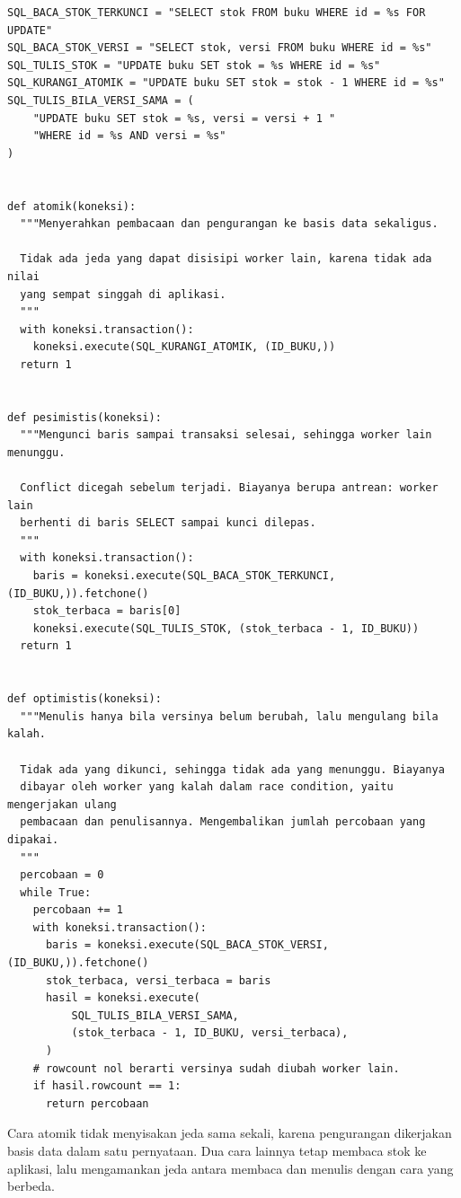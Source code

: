 \begin{lstlisting}[style=PythonStyle, caption={Tiga cara mencegah lost update, tersedia di \berkas{sources/chapter03/transaksi-konkuren.py}}, label={lst:konkuren}]
SQL_BACA_STOK_TERKUNCI = "SELECT stok FROM buku WHERE id = %s FOR UPDATE"
SQL_BACA_STOK_VERSI = "SELECT stok, versi FROM buku WHERE id = %s"
SQL_TULIS_STOK = "UPDATE buku SET stok = %s WHERE id = %s"
SQL_KURANGI_ATOMIK = "UPDATE buku SET stok = stok - 1 WHERE id = %s"
SQL_TULIS_BILA_VERSI_SAMA = (
    "UPDATE buku SET stok = %s, versi = versi + 1 "
    "WHERE id = %s AND versi = %s"
)


def atomik(koneksi):
  """Menyerahkan pembacaan dan pengurangan ke basis data sekaligus.

  Tidak ada jeda yang dapat disisipi worker lain, karena tidak ada nilai
  yang sempat singgah di aplikasi.
  """
  with koneksi.transaction():
    koneksi.execute(SQL_KURANGI_ATOMIK, (ID_BUKU,))
  return 1


def pesimistis(koneksi):
  """Mengunci baris sampai transaksi selesai, sehingga worker lain menunggu.

  Conflict dicegah sebelum terjadi. Biayanya berupa antrean: worker lain
  berhenti di baris SELECT sampai kunci dilepas.
  """
  with koneksi.transaction():
    baris = koneksi.execute(SQL_BACA_STOK_TERKUNCI, (ID_BUKU,)).fetchone()
    stok_terbaca = baris[0]
    koneksi.execute(SQL_TULIS_STOK, (stok_terbaca - 1, ID_BUKU))
  return 1


def optimistis(koneksi):
  """Menulis hanya bila versinya belum berubah, lalu mengulang bila kalah.

  Tidak ada yang dikunci, sehingga tidak ada yang menunggu. Biayanya
  dibayar oleh worker yang kalah dalam race condition, yaitu mengerjakan ulang
  pembacaan dan penulisannya. Mengembalikan jumlah percobaan yang dipakai.
  """
  percobaan = 0
  while True:
    percobaan += 1
    with koneksi.transaction():
      baris = koneksi.execute(SQL_BACA_STOK_VERSI, (ID_BUKU,)).fetchone()
      stok_terbaca, versi_terbaca = baris
      hasil = koneksi.execute(
          SQL_TULIS_BILA_VERSI_SAMA,
          (stok_terbaca - 1, ID_BUKU, versi_terbaca),
      )
    # rowcount nol berarti versinya sudah diubah worker lain.
    if hasil.rowcount == 1:
      return percobaan
\end{lstlisting}

Cara atomik tidak menyisakan jeda sama sekali, karena pengurangan dikerjakan
basis data dalam satu pernyataan. Dua cara lainnya tetap membaca stok ke
aplikasi, lalu mengamankan jeda antara membaca dan menulis dengan cara yang
berbeda.

